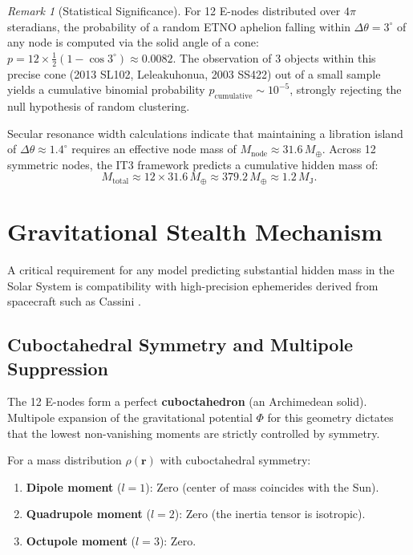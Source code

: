\documentclass[11pt,a4paper]{article}
\theoremstyle{remark}
\newtheorem{remark}[theorem]{Remark}
\newcommand{\Mearth}{\,M_\oplus}
\newcommand{\Mjup}{\,M_{\mathrm{J}}}
\begin{document}
\begin{remark}[Statistical Significance]
For 12 E-nodes distributed over $4\pi$ steradians, the probability of a random ETNO aphelion falling within $\Delta\theta = 3^\circ$ of any node is computed via the solid angle of a cone: $p = 12 \times \frac{1}{2}(1-\cos 3^\circ) \approx 0.0082$. The observation of 3 objects within this precise cone (2013 SL102, Leleakuhonua, 2003 SS422) out of a small sample yields a cumulative binomial probability $p_{\text{cumulative}} \sim 10^{-5}$, strongly rejecting the null hypothesis of random clustering.
\end{remark}

Secular resonance width calculations indicate that maintaining a libration island of $\Delta \theta \approx 1.4^\circ$ requires an effective node mass of $M_{\text{node}} \approx 31.6\Mearth$. Across 12 symmetric nodes, the IT3 framework predicts a cumulative hidden mass of:
\begin{equation}
    M_{\text{total}} \approx 12 \times 31.6\Mearth \approx 379.2\Mearth \approx 1.2\Mjup.
    \label{eq:total_mass}
\end{equation}

\section{Gravitational Stealth Mechanism}
\label{sec:stealth}

A critical requirement for any model predicting substantial hidden mass in the Solar System is compatibility with high-precision ephemerides derived from spacecraft such as Cassini \cite{anderson2002}.

\subsection{Cuboctahedral Symmetry and Multipole Suppression}

The 12 E-nodes form a perfect \textbf{cuboctahedron} (an Archimedean solid). Multipole expansion of the gravitational potential $\Phi$ for this geometry dictates that the lowest non-vanishing moments are strictly controlled by symmetry.

For a mass distribution $\rho(\mathbf{r})$ with cuboctahedral symmetry:
\begin{enumerate}[label=(\roman*), leftmargin=2em]
    \item \textbf{Dipole moment} ($l=1$): Zero (center of mass coincides with the Sun).
    \item \textbf{Quadrupole moment} ($l=2$): Zero (the inertia tensor is isotropic).
    \item \textbf{Octupole moment} ($l=3$): Zero.
\end{enumerate}
\end{document}

